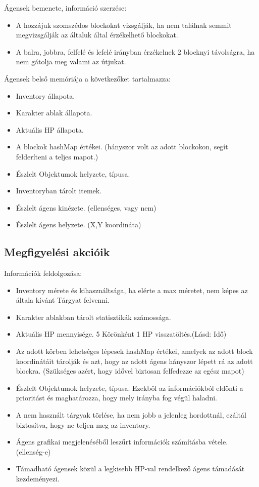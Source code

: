 Ágensek bemenete, információ szerzése:
\begin{itemize}
    \item A hozzájuk szomszédos blockokat vizsgálják, ha nem találnak semmit megvizsgálják az általuk által érzékelhető blockokat.
    \item A balra, jobbra, felfelé és lefelé irányban érzékelnek 2 blocknyi távolságra, ha nem gátolja meg valami az útjukat.
\end{itemize}

\noindent Ágensek belső memóriája a következőket tartalmazza:
\begin{itemize}
    \item Inventory állapota.
    \item Karakter ablak állapota.
    \item Aktuális HP állapota.
    \item A blockok hashMap értékei. (hányszor volt az adott blockokon, segít felderíteni a teljes mapot.)
    \item Észlelt Objektumok helyzete, típusa.
    \item Inventoryban tárolt itemek.
    \item Észlelt ágens kinézete. (ellenséges, vagy nem)
    \item Észlelt ágens helyzete. (X,Y koordináta)
\end{itemize}

\subsection{Megfigyelési akcióik}

\noindent Információk feldolgozása:
\begin{itemize}
    \item Inventory mérete és kihasználtsága, ha elérte a max méretet, nem képes az általa kívánt Tárgyat felvenni.
    \item Karakter ablakban tárolt statisztikák számossága.
    \item Aktuális HP mennyisége. 5 Körönként 1 HP visszatöltés.(Lásd: Idő)
    \item Az adott körben lehetséges lépesek hashMap értékei, amelyek az adott block koordinátáit tárolják és azt, hogy az adott ágens hányszor lépett rá az adott blockra. (Szükséges azért, hogy idővel biztosan felfedezze az egész mapot)
    \item Észlelt Objektumok helyzete, típusa. Ezekből az információkból eldönti a prioritást és maghatározza, hogy mely irányba fog végül haladni.
    \item A nem használt tárgyak törlése, ha nem jobb a jelenleg hordottnál, ezáltál biztosítva, hogy ne teljen meg az inventory.
    \item Ágens grafikai megjelenéséből leszűrt információk számításba vétele. (ellenség-e)
    \item Támadható ágensek közül a legkisebb HP-val rendelkező ágens támadását kezdeményezi.
\end{itemize}

